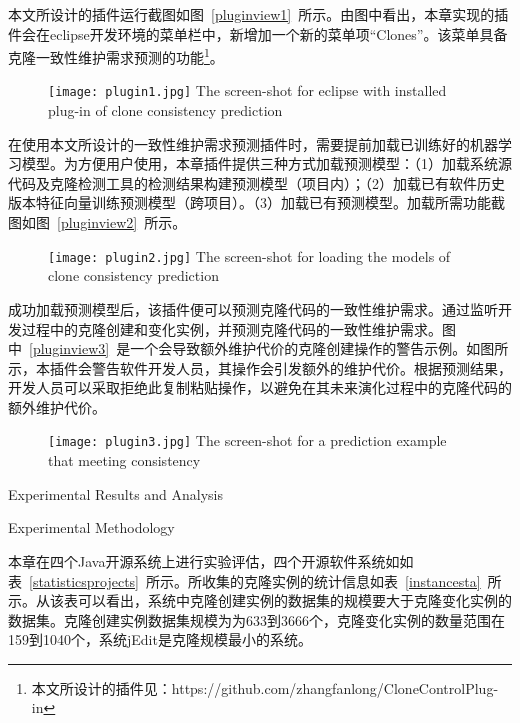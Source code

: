 本文所设计的插件运行截图如图~\ref{pluginview1}~所示。由图中看出，本章实现的插件会在eclipse开发环境的菜单栏中，新增加一个新的菜单项“Clones”。该菜单具备克隆一致性维护需求预测的功能\footnote{本文所设计的插件见：https://github.com/zhangfanlong/CloneControlPlug-in}。

\begin{figure}[htbp]
\centering
\texttt{[image: plugin1.jpg]}
{The screen-shot for eclipse with installed plug-in of clone consistency prediction}
\vspace{-1em}
\end{figure}

在使用本文所设计的一致性维护需求预测插件时，需要提前加载已训练好的机器学习模型。为方便用户使用，本章插件提供三种方式加载预测模型：（1）加载系统源代码及克隆检测工具的检测结果构建预测模型（项目内）；（2）加载已有软件历史版本特征向量训练预测模型（跨项目）。（3）加载已有预测模型。加载所需功能截图如图~\ref{pluginview2}~所示。

\begin{figure}[htbp]
\centering
\texttt{[image: plugin2.jpg]}
{The screen-shot for loading the models of clone consistency prediction}
\vspace{-1em}
\end{figure}

成功加载预测模型后，该插件便可以预测克隆代码的一致性维护需求。通过监听开发过程中的克隆创建和变化实例，并预测克隆代码的一致性维护需求。图中~\ref{pluginview3}~是一个会导致额外维护代价的克隆创建操作的警告示例。如图所示，本插件会警告软件开发人员，其操作会引发额外的维护代价。根据预测结果，开发人员可以采取拒绝此复制粘贴操作，以避免在其未来演化过程中的克隆代码的额外维护代价。

\begin{figure}[htbp]
\centering
\texttt{[image: plugin3.jpg]}
{The screen-shot for a prediction example that meeting consistency}
\vspace{-1em}
\end{figure}

{Experimental Results and Analysis}

{Experimental Methodology}

本章在四个Java开源系统上进行实验评估，四个开源软件系统如如表~\ref{statisticsprojects}~所示。所收集的克隆实例的统计信息如表~\ref{instancesta}~所示。从该表可以看出，系统中克隆创建实例的数据集的规模要大于克隆变化实例的数据集。克隆创建实例数据集规模为为633到3666个，克隆变化实例的数量范围在159到1040个，系统jEdit是克隆规模最小的系统。

